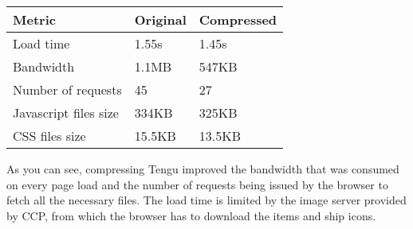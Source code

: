\begin{table}[h]
\centering
\begin{tabular}{|l|l|l|}
\hline Metric & Original & Compressed \\ 
\hline Load time & 1.55s & 1.45s \\ 
\hline Bandwidth & 1.1MB & 547KB \\ 
\hline Number of requests & 45 & 27 \\ 
\hline Javascript files size & 334KB & 325KB \\ 
\hline CSS files size & 15.5KB & 13.5KB \\ 
\hline 
\end{tabular}
\end{table}

As you can see, compressing Tengu improved the bandwidth that was consumed on every page load and the number of requests being issued by the browser to fetch all the necessary files. The load time is limited by the image server provided by CCP, from which the browser has to download the items and ship icons.
